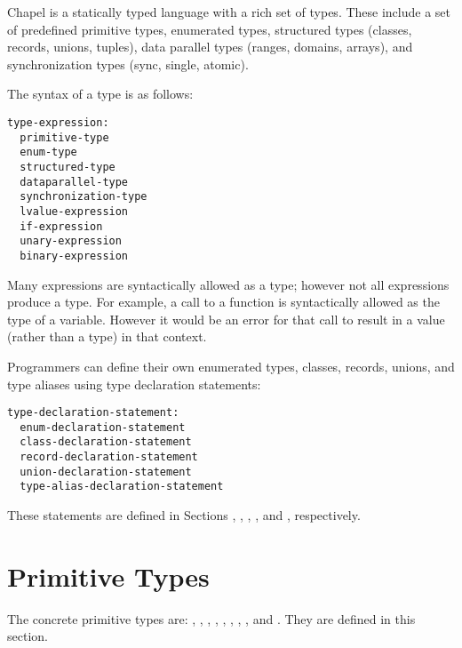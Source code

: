 \label{Types}

Chapel is a statically typed language with a rich set of types.  These
include a set of predefined primitive types, enumerated types,
structured types (classes, records, unions, tuples),
data parallel types (ranges, domains, arrays), and synchronization
types (sync, single, atomic).

The syntax of a type is as follows:

\begin{syntax}
\begin{verbatim}
type-expression:
  primitive-type
  enum-type
  structured-type
  dataparallel-type
  synchronization-type
  lvalue-expression
  if-expression
  unary-expression
  binary-expression
\end{verbatim}
\end{syntax}

Many expressions are syntactically allowed as a type; however not
all expressions produce a type. For example, a call to a function is
syntactically allowed as the type of a variable. However it would be an
error for that call to result in a value (rather than a type) in that
context.

Programmers can define their own enumerated types, classes, records,
unions, and type aliases using type declaration statements:

\begin{syntax}
\begin{verbatim}
type-declaration-statement:
  enum-declaration-statement
  class-declaration-statement
  record-declaration-statement
  union-declaration-statement
  type-alias-declaration-statement
\end{verbatim}
\end{syntax}

These statements are defined in Sections ,
, ,
, and , respectively.

\section{Primitive Types}
\label{Primitive_Types}

The concrete primitive types are: , , ,
, , , , ,
 and .  They are defined in this section.


